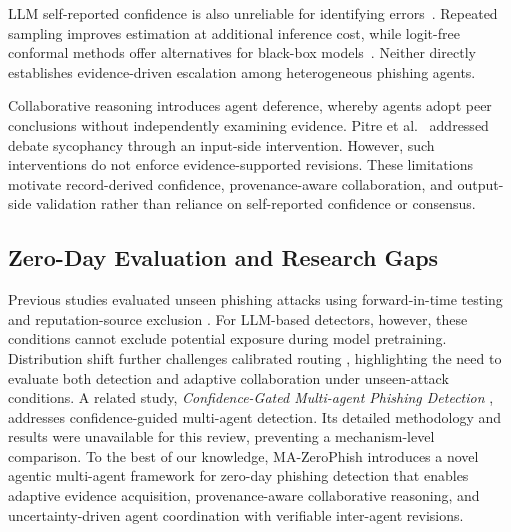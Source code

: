 LLM self-reported confidence is also unreliable
for identifying errors~\cite{xiong2024can}.
Repeated sampling improves estimation at
additional inference cost, while logit-free
conformal methods offer alternatives for
black-box models~\cite{su2024api}.
Neither directly establishes evidence-driven
escalation among heterogeneous phishing agents.

Collaborative reasoning introduces agent
deference, whereby agents adopt peer conclusions
without independently examining evidence.
Pitre et al.~\cite{pitre2025consensagent}
addressed debate sycophancy through an
input-side intervention. However, such
interventions do not enforce evidence-supported
revisions. These limitations motivate
record-derived confidence, provenance-aware
collaboration, and output-side validation
rather than reliance on self-reported
confidence or consensus.

\subsection{Zero-Day Evaluation and Research Gaps}

Previous studies evaluated unseen phishing
attacks using forward-in-time testing and
reputation-source exclusion
\cite{lin2021phishpedia,liu2023knowledge}.
For LLM-based detectors, however, these
conditions cannot exclude potential exposure
during model pretraining. Distribution shift
further challenges calibrated routing
\cite{jitkrittum2023when}, highlighting the
need to evaluate both detection and adaptive
collaboration under unseen-attack conditions. A related study, \emph{Confidence-Gated
Multi-agent Phishing Detection}
\cite{li2026phishcascade}, addresses
confidence-guided multi-agent detection.
Its detailed methodology and results were
unavailable for this review, preventing
a mechanism-level comparison.
To the best of our knowledge, MA-ZeroPhish
introduces a novel agentic multi-agent framework
for zero-day phishing detection that enables
adaptive evidence acquisition, provenance-aware
collaborative reasoning, and uncertainty-driven
agent coordination with verifiable
inter-agent revisions.


